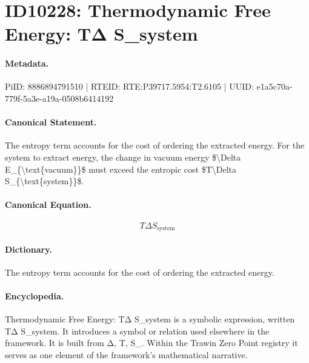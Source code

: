 \section*{ID10228: Thermodynamic Free Energy: TΔ S\_system}
\paragraph{Metadata.}
PiID: 8886894791510 | RTEID: RTE:P39717.5954:T2.6105 | UUID: e1a5c70a-779f-5a3e-a19a-0508b6414192

\paragraph{Canonical Statement.}
The entropy term accounts for the cost of ordering the extracted energy. For the system to extract energy, the change in vacuum energy \$\textbackslash{}Delta E\_\{\textbackslash{}text\{vacuum\}\}\$ must exceed the entropic cost \$T\textbackslash{}Delta S\_\{\textbackslash{}text\{system\}\}\$.

\paragraph{Canonical Equation.}
\[
T\Delta S_{\text{system}}
\]

\paragraph{Dictionary.}
The entropy term accounts for the cost of ordering the extracted energy.

\paragraph{Encyclopedia.}
Thermodynamic Free Energy: TΔ S\_system is a symbolic expression, written TΔ S\_system. It introduces a symbol or relation used elsewhere in the framework. It is built from Δ, T, S\_. Within the Trawin Zero Point registry it serves as one element of the framework's mathematical narrative.
